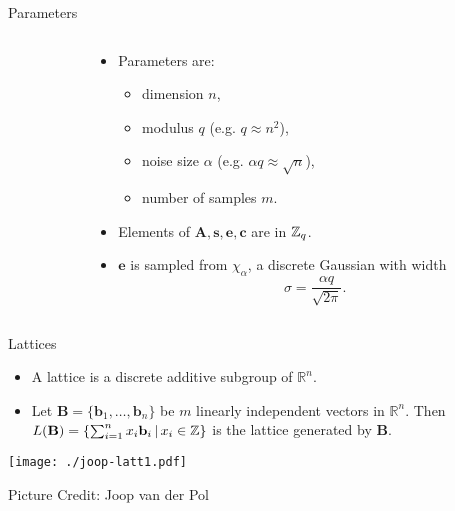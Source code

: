 \documentclass[presentation,smaller]{beamer}
\newcommand{\ZZ}[1][blank]{\ensuremath{\ifthenelse{\equal{#1}{blank}}{\mathbb{Z}}{\mathbb{Z}\left[#1\right]}\xspace}}
\renewcommand{\vec}[1]{\ensuremath{\mathbf{#1}}\xspace}
\begin{document}
\begin{frame}[label={sec:org3159ad1}]{Parameters}
\begin{columns}
\begin{column}{0.5\columnwidth}
\end{column}


\begin{column}{0.5\columnwidth}
\begin{itemize}
\item Parameters are: 
\begin{itemize}
\item dimension \(n\),
\item modulus \(q\) (e.g. \(q \approx n^2\)),
\item noise size \(\alpha\) (e.g. \(\alpha q \approx \sqrt{n}\)),
\item number of samples \(m\).
\end{itemize}

\item Elements of \(\vec{A}, \vec{s}, \vec{e}, \vec{c}\) are in \(\ZZ_q\).
\item \(\vec{e}\) is sampled from \(χ_{α}\), a discrete Gaussian with width \[\sigma=\frac{\alpha q}{\sqrt{2 \pi}}.\]
\end{itemize}
\end{column}
\end{columns}
\end{frame}


\begin{frame}[label={sec:orgd1aa6e2}]{Lattices}
\begin{itemize}
\item A lattice is a discrete additive subgroup of \(\mathbb{R}^n\).

\item Let \(\vec{B} = \{ \vec{b}_1, \ldots, \vec{b}_n \}\) be \(m\) linearly independent vectors in \(\mathbb{R}^n\). Then \(L(\vec{B})=\{ \sum_{i=1}^{n} x_i \vec{b}_i \,|\, x_i \in \ZZ\}\) is the lattice generated by \(\vec{B}\).
\end{itemize}

\begin{center}
\texttt{[image: ./joop-latt1.pdf]}
\end{center}

\tiny Picture Credit: Joop van der Pol
\end{frame}
\end{document}
